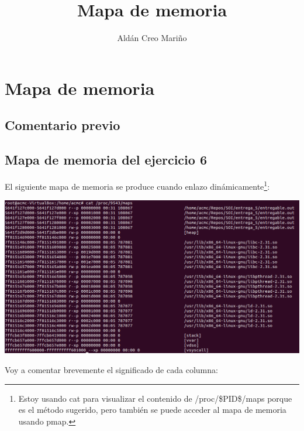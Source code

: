 \documentclass[a4paper]{article}
\title{Mapa de memoria}
\author{Aldán Creo Mariño}
\begin{document}

\section{Mapa de memoria}

\subsection{Comentario previo}

\subsection{Mapa de memoria del ejercicio 6}

El siguiente mapa de memoria se produce cuando enlazo dinámicamente\footnote{Estoy usando {\ttfamily cat} para visualizar el contenido de {\ttfamily /proc/\$PID\$/maps} porque es el método sugerido, pero también se puede acceder al mapa de memoria usando {\ttfamily pmap}.}:

\includegraphics[scale=0.421]{6_padre.png}

Voy a comentar brevemente el significado de cada columna:
\end{document}
